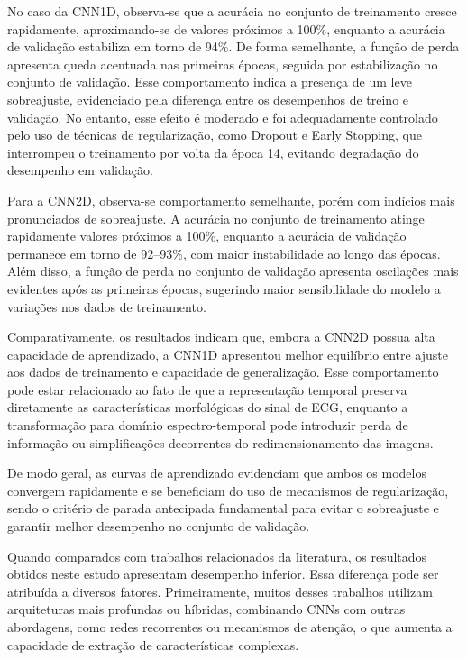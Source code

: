 No caso da CNN1D, observa-se que a acurácia no conjunto de treinamento cresce rapidamente, aproximando-se de valores próximos a 100\%, enquanto a 
acurácia de validação estabiliza em torno de 94\%. De forma semelhante, a função de perda apresenta queda acentuada nas primeiras épocas, seguida por 
estabilização no conjunto de validação. Esse comportamento indica a presença de um leve sobreajuste, evidenciado pela diferença entre os desempenhos de 
treino e validação. No entanto, esse efeito é moderado e foi adequadamente controlado pelo uso de técnicas de regularização, como Dropout e Early 
Stopping, que interrompeu o treinamento por volta da época 14, evitando degradação do desempenho em validação.

Para a CNN2D, observa-se comportamento semelhante, porém com indícios mais pronunciados de sobreajuste. A acurácia no conjunto de treinamento atinge 
rapidamente valores próximos a 100\%, enquanto a acurácia de validação permanece em torno de 92–93\%, com maior instabilidade ao longo das épocas. 
Além disso, a função de perda no conjunto de validação apresenta oscilações mais evidentes após as primeiras épocas, sugerindo maior sensibilidade do 
modelo a variações nos dados de treinamento.

Comparativamente, os resultados indicam que, embora a CNN2D possua alta capacidade de aprendizado, a CNN1D apresentou melhor equilíbrio entre ajuste aos 
dados de treinamento e capacidade de generalização. Esse comportamento pode estar relacionado ao fato de que a representação temporal preserva 
diretamente as características morfológicas do sinal de ECG, enquanto a transformação para domínio espectro-temporal pode introduzir perda de informação 
ou simplificações decorrentes do redimensionamento das imagens.

De modo geral, as curvas de aprendizado evidenciam que ambos os modelos convergem rapidamente e se beneficiam do uso de mecanismos de regularização, 
sendo o critério de parada antecipada fundamental para evitar o sobreajuste e garantir melhor desempenho no conjunto de validação.

Quando comparados com trabalhos relacionados da literatura, os resultados obtidos neste estudo apresentam desempenho inferior. Essa diferença pode ser 
atribuída a diversos fatores. Primeiramente, muitos desses trabalhos utilizam arquiteturas mais profundas ou híbridas, combinando CNNs com outras 
abordagens, como redes recorrentes ou mecanismos de atenção, o que aumenta a capacidade de extração de características complexas.

